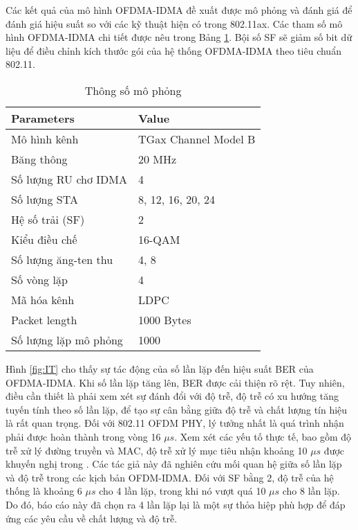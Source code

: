Các kết quả của mô hình OFDMA-IDMA đề xuất được mô phỏng và đánh giá để đánh giá hiệu suất so với các kỹ thuật hiện có trong 802.11ax. Các tham số mô hình OFDMA-IDMA chi tiết được nêu trong Bảng \ref{tab:Para}. Bội số SF sẽ giảm số bit dữ liệu để điều chỉnh kích thước gói của hệ thống OFDMA-IDMA theo tiêu chuẩn 802.11.

\begin{table}[H]
	\normalsize
	\centering
	\caption{Thông số mô phỏng}
	\label{tab:Para}
	\begin{tabular}{|l|l|}
		\hline
		\textbf{Parameters}   & \textbf{Value}       \\ \hline
		Mô hình kênh          & TGax Channel Model B \\ \hline
		Băng thông            & 20 MHz               \\ \hline
		Số lượng RU chơ IDMA  & 4                    \\ \hline
		Số lượng STA          & 8, 12, 16, 20, 24    \\ \hline
		Hệ số trải (SF)       & 2                    \\ \hline
		Kiểu điều chế         & 16-QAM               \\ \hline
		Số lượng ăng-ten thu  & 4, 8                 \\ \hline
		Số vòng lặp           & 4                    \\ \hline
		Mã hóa kênh           & LDPC                 \\ \hline
		Packet length         & 1000 Bytes           \\ \hline
		Số lượng lặp mô phỏng & 1000                 \\ \hline
	\end{tabular}
\end{table}
Hình \ref{fig:IT} cho thấy sự tác động của số lần lặp đến hiệu suất BER của OFDMA-IDMA. Khi số lần lặp tăng lên, BER được cải thiện rõ rệt. Tuy nhiên, điều cần thiết là phải xem xét sự đánh đổi với độ trễ, độ trễ có xu hướng tăng tuyến tính theo số lần lặp, để tạo sự cân bằng giữa độ trễ và chất lượng tín hiệu là rất quan trọng.
Đối với 802.11 \acrshort{OFDM} PHY, lý tưởng nhất là quá trình nhận phải được hoàn thành trong vòng 16 $\mu s$. Xem xét các yếu tố thực tế, bao gồm độ trễ xử lý đường truyền và \acrshort{MAC}, độ trễ xử lý mục tiêu nhận khoảng 10 $\mu s$ được khuyến nghị trong \cite{UL-OFDM-IDMA}.
Các tác giả này đã nghiên cứu mối quan hệ giữa số lần lặp và độ trễ trong các kịch bản OFDM-IDMA. Đối với SF bằng 2, độ trễ của hệ thống là khoảng 6 $\mu s$ cho 4 lần lặp, trong khi nó vượt quá 10 $\mu s$ cho 8 lần lặp. Do đó, báo cáo này đã chọn ra 4 lần lặp lại là một sự thỏa hiệp phù hợp để đáp ứng các yêu cầu về chất lượng và độ trễ.

